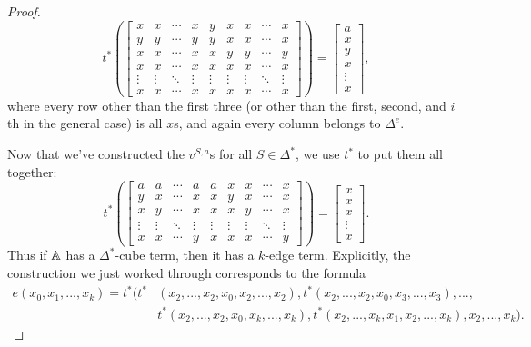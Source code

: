 \documentclass[letterpaper,11pt]{article}
\begin{document}
\begin{proof}
\[t^*\left(\begin{bmatrix} x & x & \cdots & x & y & x & x & \cdots & x\\ y & y & \cdots & y & y & x & x & \cdots & x\\ x & x & \cdots & x & x & y & y & \cdots & y\\ x & x & \cdots & x & x & x & x & \cdots & x\\ \vdots & \vdots & \ddots & \vdots & \vdots & \vdots & \vdots & \ddots & \vdots \\ x & x & \cdots & x & x & x & x & \cdots & x \end{bmatrix}\right) = \begin{bmatrix}a\\ x\\ y\\ x\\ \vdots \\ x\end{bmatrix},
\]
where every row other than the first three (or other than the first, second, and $i$th in the general case) is all $x$s, and again every column belongs to $\Delta^e$.

Now that we've constructed the $v^{S,a}$s for all $S \in \Delta^*$, we use $t^*$ to put them all together:
\[
t^*\left(\begin{bmatrix} a & a & \cdots & a & a & x & x & \cdots & x\\ y & x & \cdots & x & x & y & x & \cdots & x\\ x & y & \cdots & x & x & x & y & \cdots & x\\ \vdots & \vdots & \ddots & \vdots & \vdots & \vdots & \vdots & \ddots & \vdots \\ x & x & \cdots & y & x & x & x & \cdots & y \end{bmatrix}\right) = \begin{bmatrix}x\\ x\\ x\\ \vdots \\ x\end{bmatrix}.
\]
Thus if $\mathbb{A}$ has a $\Delta^*$-cube term, then it has a $k$-edge term. Explicitly, the construction we just worked through corresponds to the formula
\begin{align*}
e(x_0,x_1,...,x_k) = t^*(t^*&(x_2, ..., x_2, x_0, x_2, ..., x_2), t^*(x_2, ..., x_2, x_0, x_3, ..., x_3), ...,\\
&t^*(x_2, ..., x_2, x_0, x_k, ..., x_k), t^*(x_2, ..., x_k, x_1, x_2, ..., x_k), x_2, ..., x_k).
\end{align*}


\end{proof}
\end{document}
